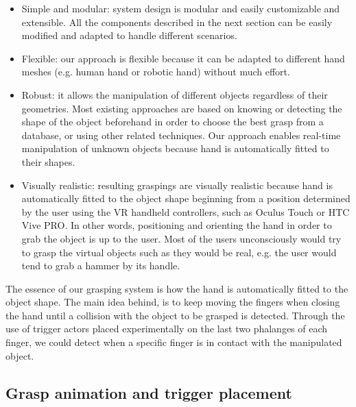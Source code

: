 \begin{itemize}
	\item Simple and modular: system design is modular and easily customizable and extensible. All the components described in the next section can be easily modified and adapted to handle different scenarios.
	\item Flexible: our approach is flexible because it can be adapted to different hand meshes (e.g. human hand or robotic hand) without much effort. 
	\item Robust: it allows the manipulation of different objects regardless of their geometries. Most existing approaches are based on knowing or detecting the shape of the object beforehand in order to choose the best grasp from a database, or using other related techniques. Our approach enables real-time manipulation of unknown objects because hand is automatically fitted to their shapes.
	\item Visually realistic: resulting graspings are visually realistic because hand is automatically fitted to the object shape beginning from a position determined by the user using the VR handheld controllers, such as Oculus Touch or HTC Vive PRO. In other words, positioning and orienting the hand in order to grab the object is up to the user. Most of the users unconsciously would try to grasp the virtual objects such as they would be real, e.g. the user would tend to grab a hammer by its handle.
\end{itemize}

The essence of our grasping system is how the hand is automatically fitted to the object shape. The main idea behind, is to keep moving the fingers when closing the hand until a collision with the object to be grasped is detected. Through the use of trigger actors placed experimentally on the last two phalanges of each finger, we could detect when a specific finger is in contact with the manipulated object. 


\subsection{Grasp animation and trigger placement}

